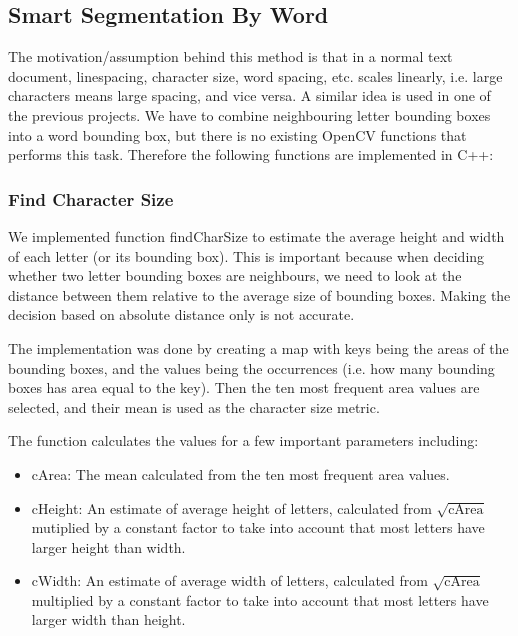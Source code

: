 \documentclass[conference]{IEEEtran}
\begin{document}
\subsection{Smart Segmentation By Word}

The motivation/assumption behind this method is that in a normal text document, linespacing, character size, word spacing, etc. scales linearly, i.e. large characters means large spacing, and vice versa.  A similar idea is used in one of the previous projects.\cite{Hampapur}  We have to combine neighbouring letter bounding boxes into a word bounding box, but there is no existing OpenCV functions that performs this task.  Therefore the following functions are implemented in C++:

\subsubsection{Find Character Size}
We implemented function findCharSize to estimate the average height and width of each letter (or its bounding box).  This is important because when deciding whether two letter bounding boxes are neighbours, we need to look at the distance between them relative to the average size of bounding boxes.  Making the decision based on absolute distance only is not accurate.

The implementation was done by creating a map with keys being the areas of the bounding boxes, and the values being the occurrences (i.e. how many bounding boxes has area equal to the key).  Then the ten most frequent area values are selected, and their mean is used as the character size metric.

The function calculates the values for a few important parameters including:
\begin{itemize}
\item cArea: The mean calculated from the ten most frequent area values.
\item cHeight: An estimate of average height of letters, calculated from $\sqrt{\mbox{cArea}}$ mutiplied by a constant factor to take into account that most letters have larger height than width.
\item cWidth: An estimate of average width of letters, calculated from $\sqrt{\mbox{cArea}}$ multiplied by a constant factor to take into account that most letters have larger width than height.
\end{itemize}
\end{document}
